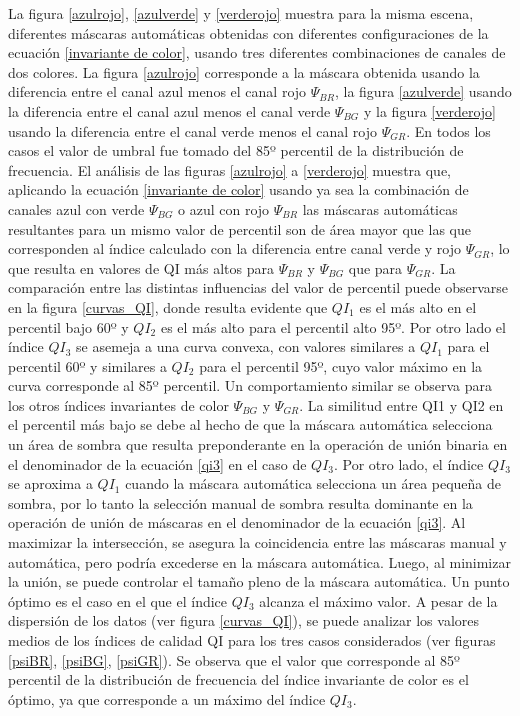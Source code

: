 La figura \ref{azulrojo}, \ref{azulverde} y \ref{verderojo} muestra para la misma escena, diferentes máscaras automáticas obtenidas con diferentes configuraciones de la ecuación \ref{invariante de color}, usando tres diferentes combinaciones de canales de dos colores. La figura \ref{azulrojo} corresponde a la máscara obtenida usando la diferencia entre el canal azul menos el canal rojo $\Psi_{BR}$, la figura \ref{azulverde} usando la diferencia entre el canal azul menos el canal verde $\Psi_{BG}$ y la figura \ref{verderojo} usando la diferencia entre el canal verde menos el canal rojo $\Psi_{GR}$. En todos los casos el valor de umbral fue tomado del 85º percentil de la distribución de frecuencia. El análisis de las figuras \ref{azulrojo} a \ref{verderojo} muestra que, aplicando la ecuación \ref{invariante de color} usando ya sea la combinación de canales azul con verde $\Psi_{BG}$ o azul con rojo $\Psi_{BR}$  las máscaras automáticas resultantes para un mismo valor de percentil son de área mayor que las que corresponden al índice calculado con la diferencia entre canal verde y rojo $\Psi_{GR}$, lo que resulta en valores de QI más altos para $\Psi_{BR}$ y $\Psi_{BG}$ que para $\Psi_{GR}$. La comparación entre las distintas influencias del valor de percentil puede observarse en la figura \ref{curvas_QI}, donde resulta evidente que $QI_1$ es el más alto en el percentil bajo 60º y $QI_2$ es el más alto para el percentil alto 95º. Por otro lado el índice $QI_3$ se asemeja a una curva convexa, con valores similares a $QI_1$ para el percentil 60º y similares a $QI_2$ para el percentil 95º, cuyo valor máximo en la curva corresponde al 85º percentil. Un comportamiento similar se observa para los otros índices invariantes de color $\Psi_{BG}$ y $\Psi_{GR}$. La similitud entre QI1 y QI2 en el percentil más bajo se debe al hecho de que la máscara automática selecciona un área de sombra que resulta preponderante en la operación de unión binaria en el denominador de la ecuación \ref{qi3} en el caso de $QI_3$.
Por otro lado, el índice $QI_3$ se aproxima a $QI_1$ cuando la máscara automática selecciona un área pequeña de sombra, por lo tanto la selección manual de sombra resulta dominante en la operación de unión de máscaras en el denominador de la ecuación \ref{qi3}.
Al maximizar la intersección, se asegura la coincidencia entre las máscaras manual y automática, pero podría excederse en la máscara automática. Luego, al minimizar la unión, se puede controlar el tamaño pleno de la máscara automática. Un punto óptimo es el caso en el que el índice $QI_3$ alcanza el máximo valor. A pesar de la dispersión de los datos (ver figura \ref{curvas_QI}), se puede analizar los valores medios de los índices de calidad QI para los tres casos considerados (ver figuras \ref{psiBR}, \ref{psiBG}, \ref{psiGR}). Se observa que el valor que corresponde al 85º percentil de la distribución de frecuencia del índice invariante de color es el óptimo, ya que corresponde a un máximo del índice $QI_3$.
